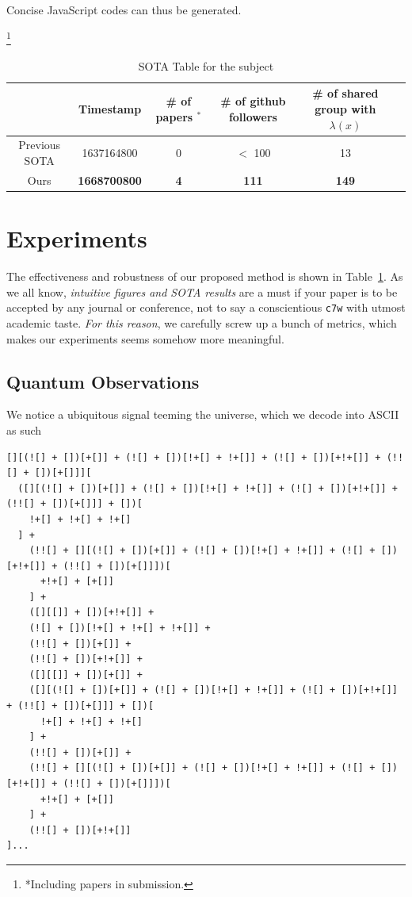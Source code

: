 \documentclass[10pt,twocolumn,letterpaper]{article}
\newcommand\blfootnote[1]{%
  \begingroup
  \renewcommand\thefootnote{}\footnote{#1}%
  \addtocounter{footnote}{-1}%
  \endgroup
}
\begin{document}
Concise JavaScript codes can thus be generated.

\blfootnote{*Including papers in submission.}
\begin{table}[htbp]
  \centering
  \caption{SOTA Table for the subject}
    \begin{tabular}{c|ccccc}
    \toprule
          & Timestamp & \# of papers $^*$ & \# of github followers & \# of shared group with $\lambda(x)$ \bigstrut\\
    \midrule
    Previous SOTA & 1637164800 & 0     & $<$ 100 & 13   \bigstrut[t]\\
    Ours  & \textbf{1668700800} & \textbf{4} & \textbf{111} & \textbf{149}  \bigstrut[b]\\
    \bottomrule
    \end{tabular}%
  \label{tab:sota-table}%
\end{table}%
\section{Experiments}

The effectiveness and robustness of our proposed method is shown in Table~\ref{tab:sota-table}. As we all know, \emph{intuitive figures and SOTA results} are a must if your paper is to be accepted by any journal or conference, not to say a conscientious \verb|c7w| with utmost academic taste. \emph{For this reason}, we carefully screw up a bunch of metrics, which makes our experiments seems somehow more meaningful.  

\subsection{Quantum Observations}

We notice a ubiquitous signal teeming the universe, which we decode into ASCII as such

\begin{lstlisting}[caption=Decoded Observation(Excerpts)]
[][(![] + [])[+[]] + (![] + [])[!+[] + !+[]] + (![] + [])[+!+[]] + (!![] + [])[+[]]][
  ([][(![] + [])[+[]] + (![] + [])[!+[] + !+[]] + (![] + [])[+!+[]] + (!![] + [])[+[]]] + [])[
    !+[] + !+[] + !+[]
  ] +
    (!![] + [][(![] + [])[+[]] + (![] + [])[!+[] + !+[]] + (![] + [])[+!+[]] + (!![] + [])[+[]]])[
      +!+[] + [+[]]
    ] +
    ([][[]] + [])[+!+[]] +
    (![] + [])[!+[] + !+[] + !+[]] +
    (!![] + [])[+[]] +
    (!![] + [])[+!+[]] +
    ([][[]] + [])[+[]] +
    ([][(![] + [])[+[]] + (![] + [])[!+[] + !+[]] + (![] + [])[+!+[]] + (!![] + [])[+[]]] + [])[
      !+[] + !+[] + !+[]
    ] +
    (!![] + [])[+[]] +
    (!![] + [][(![] + [])[+[]] + (![] + [])[!+[] + !+[]] + (![] + [])[+!+[]] + (!![] + [])[+[]]])[
      +!+[] + [+[]]
    ] +
    (!![] + [])[+!+[]]
]...

\end{lstlisting}
\end{document}
